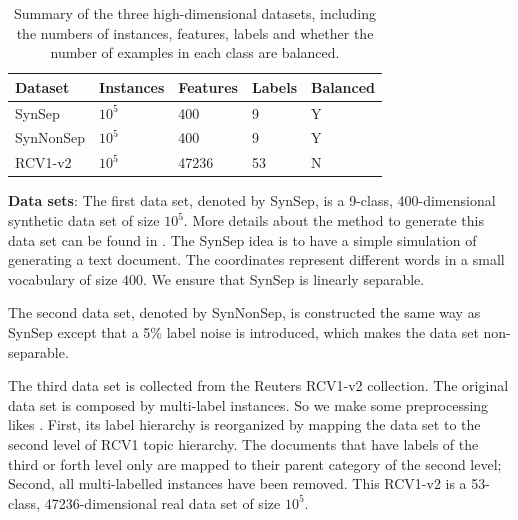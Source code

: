 \documentclass[twocolumn]{article}
\begin{document}
\begin{table}[h]
	\caption{Summary of the three high-dimensional datasets, including the numbers of instances, features, labels and whether the number of examples in each class are balanced.}
	\label{table:mce}
	\begin{center}
		\begin{tabular}{l l l l l}
			{\bf Dataset}  & {\bf Instances} & {\bf Features} & {\bf Labels}& {\bf Balanced}\\
			\hline
			SynSep & $10^5$ 	& 400 	& 9 & Y\\
			
			SynNonSep & $10^5$ & 400 	& 9 & Y\\
			
			RCV1-v2  & $10^5$ 	& 47236 	& 53 & N\\
			
			
		\end{tabular}
	\end{center}
\end{table}

\textbf{Data sets}:
The first data set, denoted by SynSep,  is a 9-class, 400-dimensional synthetic data set of size $10^5$. More details about the method to generate this data set can be found in \cite{kakade2008efficient}. The SynSep  idea is to have a simple simulation of generating a text document. The coordinates represent different words in a small vocabulary of size $400$. We ensure that SynSep is linearly separable. 

The second data set, denoted by SynNonSep, is constructed  the same way as  SynSep except that a 5\% label noise is introduced, which makes the data set non-separable. 

The third data set is collected from the Reuters RCV1-v2 collection\cite{David04RCV}. The original data set is composed by multi-label instances. So we make some preprocessing likes \cite{RB08a}. First, its label hierarchy is reorganized by mapping the data set to the second level of RCV1 topic hierarchy. The documents that have labels of the third or forth level only are mapped to their parent category of the second level; Second, all multi-labelled instances have been removed. This RCV1-v2 is a 53-class,  47236-dimensional real data set of size $10^5$. 
\end{document}
